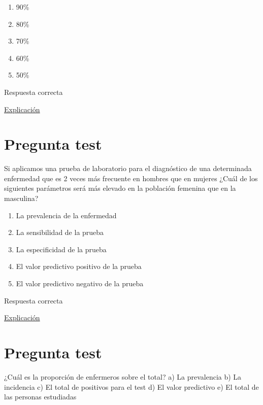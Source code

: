 \documentclass[
]{book}
\providecommand{\tightlist}{%
  \setlength{\itemsep}{0pt}\setlength{\parskip}{0pt}}
\begin{document}
\begin{enumerate}
\def\labelenumi{\alph{enumi})}
\tightlist
\item
  90\%
\item
  80\%
\item
  70\%
\item
  60\%
\item
  50\%
\end{enumerate}

Respuesta correcta

\href{https://1fjmanzano.github.io/bioestadistica/relaci\%C3\%B3n-entre-variables-cualitativas.html\#diagno\%CC\%81stico-cli\%CC\%81nico}{Explicación}

\hypertarget{pregunta-test-91}{%
\section{Pregunta test}\label{pregunta-test-91}}

Si aplicamos una prueba de laboratorio para el diagnóstico de una determinada enfermedad que es 2 veces más frecuente en hombres que en mujeres ¿Cuál de los siguientes parámetros será más elevado en la población femenina que en la masculina?

\begin{enumerate}
\def\labelenumi{\alph{enumi})}
\tightlist
\item
  La prevalencia de la enfermedad
\item
  La sensibilidad de la prueba
\item
  La especificidad de la prueba
\item
  El valor predictivo positivo de la prueba
\item
  El valor predictivo negativo de la prueba
\end{enumerate}

Respuesta correcta

\href{https://1fjmanzano.github.io/bioestadistica/relaci\%C3\%B3n-entre-variables-cualitativas.html\#diagno\%CC\%81stico-cli\%CC\%81nico}{Explicación}

\hypertarget{pregunta-test-92}{%
\section{Pregunta test}\label{pregunta-test-92}}

¿Cuál es la proporción de enfermeros sobre el total?
a) La prevalencia
b) La incidencia
c) El total de positivos para el test
d) El valor predictivo
e) El total de las personas estudiadas
\end{document}
